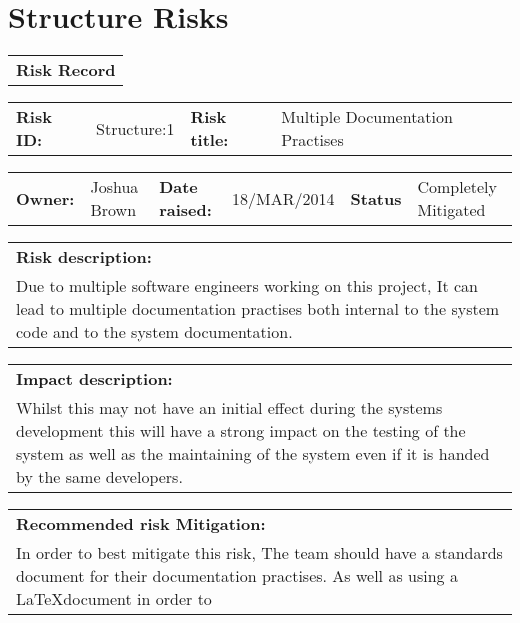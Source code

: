 \FloatBarrier

\section{Structure Risks}
\label{Structure_Risks}

\FloatBarrier

\begin{table}
	\begin{tabularx}{\textwidth}{| X |}
		\hline
		\textbf{Risk Record} \\
	\end{tabularx}
	\begin{tabularx}{\textwidth}{| l | X | l | X |}
		\hline
		\textbf{Risk ID:} & Structure:1 & \textbf{Risk title:} & Multiple Documentation Practises  \\
	\end{tabularx}
	\begin{tabularx}{\textwidth}{| l | X | l | X | l | X |}
		\hline
		\textbf{Owner:} & Joshua Brown & \textbf{Date raised:} & 18/MAR/2014 & \textbf{Status} & Completely Mitigated \\
	\end{tabularx}
	\begin{tabularx}{\textwidth}{| X |}
		\hline
		\textbf{Risk description:} \\ Due to multiple software engineers working on this project, It can lead to multiple documentation practises both internal to the system code and to the system documentation.  \\
	\end{tabularx}
	\begin{tabularx}{\textwidth}{| X |}
		\hline
		\textbf{Impact description:} \\ Whilst this may not have an initial effect during the systems development this will have a strong impact on the testing of the system as well as the maintaining of the system even if it is handed by the same developers. \\
	\end{tabularx}
	\begin{tabularx}{\textwidth}{| X |}
		\hline
		\textbf{Recommended risk Mitigation:} \\ In order to best mitigate this risk, The team should have a standards document for their documentation practises. As well as using a \LaTeX document in order to  \\
	\end{tabularx}
	\begin{tabularx}{\textwidth}{| X |}

\end{tabularx}
\end{table}
